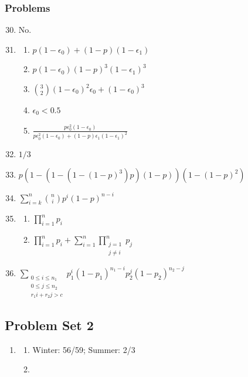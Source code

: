\documentclass{article} \usepackage[margin=1in]{geometry}
\begin{document}
\subsubsection*{Problems}
\begin{enumerate}
	\setcounter{enumi}{29}
	\item No.
	\item \begin{enumerate}
		      \item $p(1-\epsilon_0)+(1-p)(1-\epsilon_1)$
		      \item $p(1-\epsilon_0)(1-p)^3(1-\epsilon_1)^3$
		      \item $\binom{3}{2}(1-\epsilon_0)^2\epsilon_0+(1-\epsilon_0)^3$
		      \item $\epsilon_0<0.5$
		      \item $\frac{p\epsilon_0^2(1-\epsilon_0)}
			            {p\epsilon_0^2(1-\epsilon_0)+(1-p)\epsilon_1(1-\epsilon_1)^2}$
	      \end{enumerate}
	\item $1/3$
	      \setcounter{enumi}{33}
	\item $p\left(1-\left(1-\left(1-(1-p)^3\right)p\right)(1-p)\right)(1-(1-p)^2)$
	\item $\sum_{i=k}^n\binom{n}{i}p^i(1-p)^{n-i}$
	\item \begin{enumerate}
		      \item $\prod_{i=1}^np_i$
		      \item $\prod_{i=1}^np_i+\sum_{i=1}^n\prod_{\substack{j=1\\j\ne i}}^np_j$
	      \end{enumerate}
	\item $\sum_{\substack{0\le i\le n_1\\0\le j\le n_2\\r_1i+r_2j>c}}
		      p_1^i(1-p_1)^{n_1-i}p_2^j(1-p_2)^{n_2-j}$
\end{enumerate}

\subsection*{Problem Set 2}
\begin{enumerate}
	\item \begin{enumerate}
		      \item Winter: 56/59; Summer: 2/3
		      \item
	      \end{enumerate}
\end{enumerate}
\end{document}
